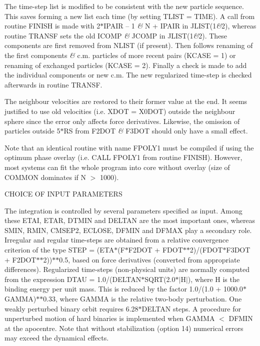  The time-step list is modified to be consistent with the new particle
 sequence.  This saves forming a new list each time (by setting TLIST
 = TIME).  A call from routine FINISH is made with 2$\ast$IPAIR -- 1 {\it\&} N + IPAIR
 in JLIST(1{\it\&}2), whereas routine TRANSF sets the old ICOMP {\it\&} JCOMP in
 JLIST(1{\it\&}2).  These components are first removed from NLIST (if present).  Then
 follows renaming of the first components {\it\&} c.m. particles of more recent
 pairs (KCASE = 1) or renaming of exchanged particles (KCASE = 2).  Finally a
 check is made to add the individual components or new c.m.  The new regularized
 time-step is checked afterwards in routine TRANSF.

 The neighbour velocities are restored to their former value at the end.  It
 seems justified to use old velocities (i.e. XDOT = X0DOT) outside the
 neighbour sphere since the error only affects force derivatives.  Likewise, the
 omission of particles outside 5$\ast$RS from F2DOT {\it\&} F3DOT
 should only have a small effect.

  Note that an identical routine with name FPOLY1 must be compiled if using
 the optimum phase overlay (i.e. CALL FPOLY1 from routine FINISH).  However,
 most systems can fit the whole program into core without 
 overlay (size of COMMON dominates if N $>$ 1000).
\bigskip
\bigskip
\centerline {CHOICE OF INPUT PARAMETERS}
\bigskip

        The integration is controlled by several parameters
    specified as input.  Among these ETAI, ETAR, DTMIN and DELTAN are
  the most important ones, whereas SMIN, RMIN, CMSEP2, ECLOSE, DFMIN and DFMAX
 play a secondary role.  Irregular and regular time-steps are obtained 
from a relative convergence criterion of the type
STEP = (ETA$\ast$(F$\ast$F2DOT + FDOT$\ast$$\ast$2)/(FDOT$\ast$F3DOT +
  F2DOT$\ast$$\ast$2))$\ast$$\ast$0.5, based on force derivatives 
 (converted from appropriate differences).  Regularized
 time-steps (non-physical units) are normally computed from the expression
  DTAU = 1.0/(DELTAN$\ast$SQRT(2.0$\ast$$\vert$H$\vert$), where H is
 the binding energy per unit mass.  This is reduced by the factor
    1.0/(1.0 + 1000.0$\ast$GAMMA)$\ast$$\ast$0.33, where GAMMA is the relative two-body
 perturbation.  One weakly perturbed binary orbit requires 6.28$\ast$DELTAN steps.  A
  procedure for unperturbed motion of hard binaries is implemented
 when GAMMA $<$ DFMIN at the apocentre.  Note that without stabilization
 (option 14) numerical errors may exceed the dynamical effects.

